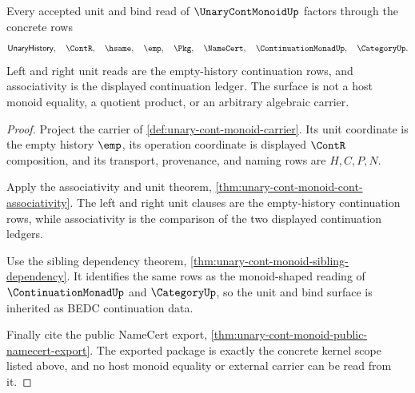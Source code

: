 \begin{theorem}
\label{thm:unary-cont-monoid-unit-bind-surface}
Every accepted unit and bind read of $\UnaryContMonoidUp$ factors through the concrete rows
$$
\mathsf{UnaryHistory},\quad \ContR,\quad \hsame,\quad \emp,\quad \Pkg,\quad \NameCert,\quad \ContinuationMonadUp,\quad \CategoryUp.
$$
Left and right unit reads are the empty-history continuation rows, and associativity is the displayed continuation ledger. The surface is not a host monoid equality, a quotient product, or an arbitrary algebraic carrier.
\end{theorem}
\begin{proof}
Project the carrier of \autoref{def:unary-cont-monoid-carrier}. Its unit coordinate is the empty history $\emp$, its operation coordinate is displayed $\ContR$ composition, and its transport, provenance, and naming rows are $H,C,P,N$.

Apply the associativity and unit theorem, \autoref{thm:unary-cont-monoid-cont-associativity}. The left and right unit clauses are the empty-history continuation rows, while associativity is the comparison of the two displayed continuation ledgers.

Use the sibling dependency theorem, \autoref{thm:unary-cont-monoid-sibling-dependency}. It identifies the same rows as the monoid-shaped reading of $\ContinuationMonadUp$ and $\CategoryUp$, so the unit and bind surface is inherited as BEDC continuation data.

Finally cite the public NameCert export, \autoref{thm:unary-cont-monoid-public-namecert-export}. The exported package is exactly the concrete kernel scope listed above, and no host monoid equality or external carrier can be read from it.
\end{proof}

